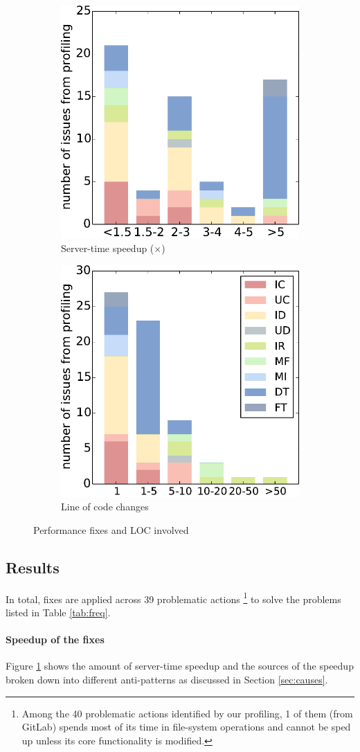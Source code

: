 \begin{figure}
\centering
\label{fig:sl}
\begin{subfigure}
\centering
    \includegraphics[width=0.4\linewidth]{hownotto/speedup}
   \caption{Server-time speedup ($\times$)}
    \label{fig:speedup}
\end{subfigure}
\begin{subfigure}
    \centering
    \includegraphics[width=0.4\linewidth]{hownotto/loc}
   \caption{Line of code changes}
    \label{fig:loc}       
\end{subfigure}
\caption{Performance fixes and LOC involved}
\end{figure}

\subsection{Results}
In total, \numacissues fixes are applied across 39 problematic actions \footnote{Among the 40 problematic actions identified by our profiling, 1 of them (from GitLab) spends most of its time in file-system operations and  cannot be sped up unless its core functionality is modified. 
} to solve the \numacissues problems listed in Table \ref{tab:freq}.
\vspace{-0.08in} 
\paragraph{\bf Speedup of the fixes}
Figure \ref{fig:speedup} shows the amount of server-time speedup and the sources of the speedup broken down into different anti-patterns as discussed in Section \ref{sec:causes}.

